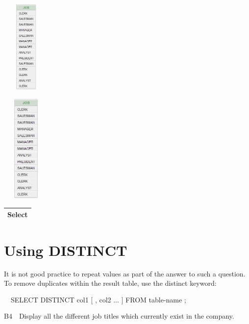 \begin{center}
  
\includegraphics[width=2.42cm,height=4.623cm]{images/img (20).png}

\end{center}
\begin{center}
  
\includegraphics[width=2.431cm,height=5.398cm]{images/img (20).png}

\end{center}
\begin{flushleft}
\tablefirsthead{}
\tablehead{}
\tabletail{}
\tablelasttail{}
\begin{supertabular}{|m{8.0cm}|}
\hline
Select 

\\\hline
\end{supertabular}
\end{flushleft}
\section{Using DISTINCT}
It is not good practice to repeat values as part of the answer to such a question.  To remove duplicates within the result table, use the distinct keyword:

\ \ SELECT DISTINCT col1 [ , col2 ... ]  FROM  table-name ;

B4\ \ Display all the different job titles which currently exist in the company.


